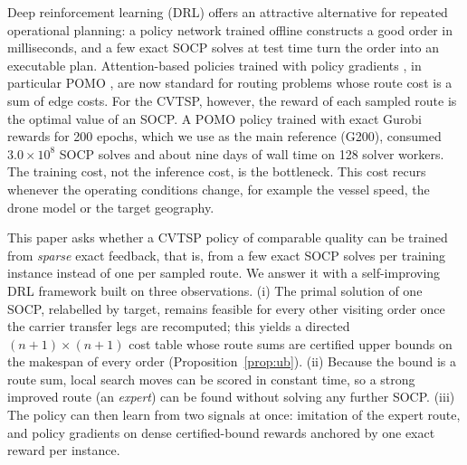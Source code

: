 \documentclass[preprint,review,12pt,authoryear]{elsarticle}
\begin{document}
Deep reinforcement learning (DRL) offers an attractive alternative for repeated operational planning: a
policy network trained offline constructs a good order in milliseconds, and a few exact SOCP solves at test time
turn the order into an executable plan. Attention-based policies trained with policy gradients
\citep{kool2019attention}, in particular POMO \citep{kwon2020pomo}, are now standard for routing problems
whose route cost is a sum of edge costs. For the CVTSP, however, the reward of each sampled route is the
optimal value of an SOCP. A POMO policy trained with exact Gurobi rewards for 200 epochs, which we use as the
main reference (G200), consumed $3.0\times10^{8}$ SOCP solves and about nine days of wall time on 128 solver
workers. The training cost, not the inference cost, is the bottleneck. This cost recurs whenever the
operating conditions change, for example the vessel speed, the drone model or the target geography.

This paper asks whether a CVTSP policy of comparable quality can be trained from \emph{sparse} exact
feedback, that is, from a few exact SOCP solves per training instance instead of one per sampled route. We
answer it with a self-improving DRL framework built on three observations. (i) The primal solution of one
SOCP, relabelled by target, remains feasible for every other visiting order once the carrier transfer legs
are recomputed; this yields a directed $(n+1)\times(n+1)$ cost table whose route sums are certified upper
bounds on the makespan of every order (Proposition~\ref{prop:ub}). (ii) Because the bound is a route sum, local
search moves can be scored in constant time, so a strong improved route (an \emph{expert}) can be found
without solving any further SOCP. (iii) The policy can then learn from two signals at once: imitation of the
expert route, and policy gradients on dense certified-bound rewards anchored by one exact reward per instance.
\end{document}
